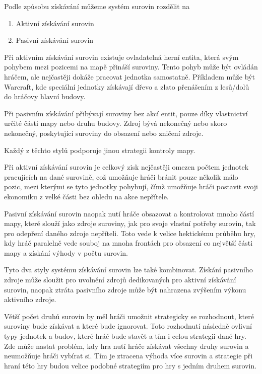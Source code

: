Podle způsobu získávání můžeme systém surovin rozdělit na
\begin{enumerate}
	\item Aktivní získávání surovin
	\item Pasivní získávání surovin
\end{enumerate}

Při aktivním získávání surovin existuje ovladatelná herní entita, která svým pohybem mezi pozicemi na mapě přináší suroviny. Tento pohyb může být ovládán hráčem, ale nejčastěji dokáže pracovat jednotka samostatně. Příkladem může být Warcraft, kde speciální jednotky získávají dřevo a zlato přenášením z lesů/dolů do hráčovy hlavní budovy.

Při pasivním získávání přibývají suroviny bez akcí entit, pouze díky vlastnictví určité části mapy nebo druhu budovy. Zdroj bývá nekonečný nebo skoro nekonečný, poskytující suroviny do obsazení nebo zničení zdroje.

Každý z těchto stylů podporuje jinou strategii kontroly mapy. 


Při aktivní získávání surovin je celkový zisk nejčastěji omezen počtem jednotek pracujících na dané surovině, což umožňuje hráči bránit pouze několik málo pozic, mezi kterými se tyto jednotky pohybují, čímž umožňuje hráči postavit svoji ekonomiku z velké části bez ohledu na akce nepřítele.

Pasivní získávání surovin naopak nutí hráče obsazovat a kontrolovat mnoho částí mapy, které slouží jako zdroje suroviny, jak pro svoje vlastní potřeby surovin, tak pro odepření daného zdroje nepříteli. Toto vede k velice hektickému průběhu hry, kdy hráč paralelně vede souboj na mnoha frontách pro obsazení co největší části mapy a získání výhody v počtu surovin.

Tyto dva styly systému získávání surovin lze také kombinovat. Získání pasivního zdroje může sloužit pro uvolnění zdrojů dedikovaných pro aktivní získávání surovin, naopak ztráta pasivního zdroje může být nahrazena zvýšením výkonu aktivního zdroje.


Větší počet druhů surovin by měl hráči umožnit strategicky se rozhodnout, které suroviny bude získávat a které bude ignorovat. Toto rozhodnutí následně ovlivní typy jednotek a budov, které hráč bude stavět a tím i celou strategii dané hry. Zde může nastat problém, kdy hra nutí hráče získávat všechny druhy surovin a neumožňuje hráči vybírat si. Tím je ztracena výhoda více surovin a strategie při hraní této hry budou velice podobné strategiím pro hry s jedním druhem surovin.
